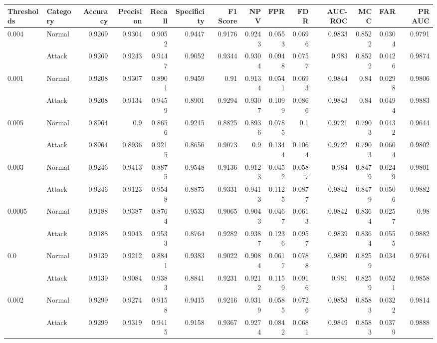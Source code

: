 \begin{tabular}{llrrrrrrrrrrrr}
\hline
 Thresholds   & Category   &   Accuracy &   Precision &   Recall &   Specificity &   F1 Score &    NPV &    FPR &    FDR &   AUC-ROC &    MCC &    FAR &   PR AUC \\
\hline
 0.004        & Normal     &     0.9269 &      0.9304 &   0.9052 &        0.9447 &     0.9176 & 0.9243 & 0.0553 & 0.0696 &    0.9833 & 0.8522 & 0.0304 &   0.9791 \\
              & Attack     &     0.9269 &      0.9243 &   0.9447 &        0.9052 &     0.9344 & 0.9304 & 0.0948 & 0.0757 &    0.983  & 0.8522 & 0.0426 &   0.9874 \\
 0.001        & Normal     &     0.9208 &      0.9307 &   0.8901 &        0.9459 &     0.91   & 0.9134 & 0.0541 & 0.0693 &    0.9844 & 0.84   & 0.0298 &   0.9806 \\
              & Attack     &     0.9208 &      0.9134 &   0.9459 &        0.8901 &     0.9294 & 0.9307 & 0.1099 & 0.0866 &    0.9843 & 0.84   & 0.0494 &   0.9883 \\
 0.005        & Normal     &     0.8964 &      0.9    &   0.8656 &        0.9215 &     0.8825 & 0.8936 & 0.0785 & 0.1    &    0.9721 & 0.7903 & 0.0432 &   0.9644 \\
              & Attack     &     0.8964 &      0.8936 &   0.9215 &        0.8656 &     0.9073 & 0.9    & 0.1344 & 0.1064 &    0.9722 & 0.7903 & 0.0604 &   0.9802 \\
 0.003        & Normal     &     0.9246 &      0.9413 &   0.8875 &        0.9548 &     0.9136 & 0.9123 & 0.0452 & 0.0587 &    0.984  & 0.8479 & 0.0249 &   0.9801 \\
              & Attack     &     0.9246 &      0.9123 &   0.9548 &        0.8875 &     0.9331 & 0.9413 & 0.1125 & 0.0877 &    0.9842 & 0.8479 & 0.0506 &   0.9882 \\
 0.0005       & Normal     &     0.9188 &      0.9387 &   0.8764 &        0.9533 &     0.9065 & 0.9043 & 0.0467 & 0.0613 &    0.9842 & 0.8364 & 0.0257 &   0.98   \\
              & Attack     &     0.9188 &      0.9043 &   0.9533 &        0.8764 &     0.9282 & 0.9387 & 0.1236 & 0.0957 &    0.9839 & 0.8364 & 0.0555 &   0.9882 \\
 0.0          & Normal     &     0.9139 &      0.9212 &   0.8841 &        0.9383 &     0.9022 & 0.9084 & 0.0617 & 0.0788 &    0.9809 & 0.8259 & 0.034  &   0.9764 \\
              & Attack     &     0.9139 &      0.9084 &   0.9383 &        0.8841 &     0.9231 & 0.9212 & 0.1159 & 0.0916 &    0.981  & 0.8259 & 0.0521 &   0.9858 \\
 0.002        & Normal     &     0.9299 &      0.9274 &   0.9158 &        0.9415 &     0.9216 & 0.9319 & 0.0585 & 0.0726 &    0.9853 & 0.8583 & 0.0322 &   0.9814 \\
              & Attack     &     0.9299 &      0.9319 &   0.9415 &        0.9158 &     0.9367 & 0.9274 & 0.0842 & 0.0681 &    0.9849 & 0.8583 & 0.0379 &   0.9888 \\
\hline
\end{tabular}
